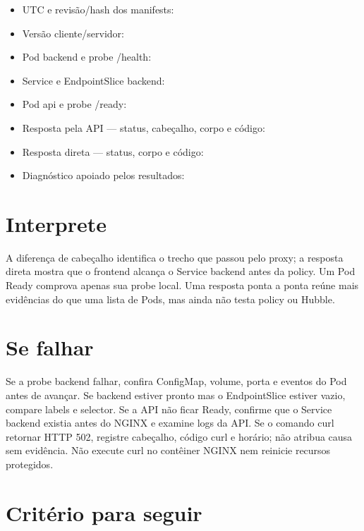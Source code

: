 \documentclass[12pt,openany,oneside,a4paper,chapter=TITLE,english,brazil]{abntex2}
\providecommand{\tightlist}{\setlength{\itemsep}{0pt}\setlength{\parskip}{0pt}}
\begin{document}
\begin{itemize}
\tightlist
\item
  UTC e revisão/hash dos manifests: \hrulefill
\item
  Versão cliente/servidor: \hrulefill
\item
  Pod backend e probe /health: \hrulefill
\item
  Service e EndpointSlice backend: \hrulefill
\item
  Pod api e probe /ready: \hrulefill
\item
  Resposta pela API --- status, cabeçalho, corpo e código: \hrulefill
\item
  Resposta direta --- status, corpo e código: \hrulefill
\item
  Diagnóstico apoiado pelos resultados: \hrulefill
\end{itemize}

\section*{Interprete}\label{interprete-1}

A diferença de cabeçalho identifica o trecho que passou pelo proxy; a resposta direta mostra que o frontend alcança o Service backend antes da policy. Um Pod Ready comprova apenas sua probe local. Uma resposta ponta a ponta reúne mais evidências do que uma lista de Pods, mas ainda não testa policy ou Hubble.

\section*{Se falhar}\label{se-falhar-1}

Se a probe backend falhar, confira ConfigMap, volume, porta e eventos do Pod antes de avançar. Se backend estiver pronto mas o EndpointSlice estiver vazio, compare labels e selector. Se a API não ficar Ready, confirme que o Service backend existia antes do NGINX e examine logs da API. Se o comando curl retornar HTTP 502, registre cabeçalho, código curl e horário; não atribua causa sem evidência. Não execute curl no contêiner NGINX nem reinicie recursos protegidos.

\section*{Critério para seguir}\label{crituxe9rio-para-seguir-1}
\end{document}
